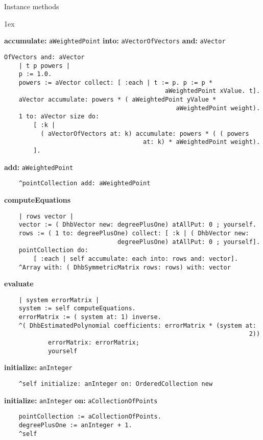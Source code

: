 Instance methods
{\parskip 1ex\par\noindent}
{\bf accumulate:} {\tt aWeightedPoint} {\bf into:} {\tt aVectorOfVectors} {\bf and:} {\tt aVector}
\begin{verbatim}
OfVectors and: aVector
    | t p powers |
    p := 1.0.
    powers := aVector collect: [ :each | t := p. p := p * 
                                            aWeightedPoint xValue. t].
    aVector accumulate: powers * ( aWeightedPoint yValue * 
                                               aWeightedPoint weight).
    1 to: aVector size do:
        [ :k |
          ( aVectorOfVectors at: k) accumulate: powers * ( ( powers 
                                      at: k) * aWeightedPoint weight).
        ].

\end{verbatim}
{\bf add:} {\tt aWeightedPoint}
\begin{verbatim}
    ^pointCollection add: aWeightedPoint

\end{verbatim}
{\bf computeEquations}
\begin{verbatim}
    | rows vector |
    vector := ( DhbVector new: degreePlusOne) atAllPut: 0 ; yourself.
    rows := ( 1 to: degreePlusOne) collect: [ :k | ( DhbVector new: 
                               degreePlusOne) atAllPut: 0 ; yourself].
    pointCollection do:
        [ :each | self accumulate: each into: rows and: vector].
    ^Array with: ( DhbSymmetricMatrix rows: rows) with: vector

\end{verbatim}
{\bf evaluate}
\begin{verbatim}
    | system errorMatrix |
    system := self computeEquations.
    errorMatrix := ( system at: 1) inverse.
    ^( DhbEstimatedPolynomial coefficients: errorMatrix * (system at: 
                                                                   2))
            errorMatrix: errorMatrix;
            yourself

\end{verbatim}
{\bf initialize:} {\tt anInteger}
\begin{verbatim}
    ^self initialize: anInteger on: OrderedCollection new

\end{verbatim}
{\bf initialize:} {\tt anInteger} {\bf on:} {\tt aCollectionOfPoints}
\begin{verbatim}
    pointCollection := aCollectionOfPoints.
    degreePlusOne := anInteger + 1.
    ^self

\end{verbatim}

